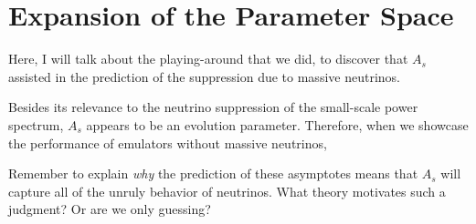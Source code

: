 \chapter{Expansion of the Parameter Space}

Here, I will talk about the playing-around that we did, to discover that
$A_s$ assisted in the prediction of the suppression due to massive neutrinos.


Besides its relevance to the neutrino suppression of the small-scale power
spectrum, $A_s$ appears to be an evolution parameter. Therefore, when we
showcase the performance of emulators without massive neutrinos, 

Remember to explain \textit{why} the prediction of these asymptotes means that $A_s$ will capture all of the unruly behavior of neutrinos. What theory motivates such a judgment? Or are we only guessing?

